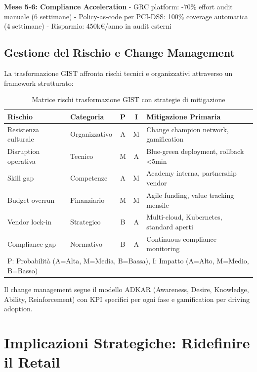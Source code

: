\textbf{Mese 5-6: Compliance Acceleration}
- GRC platform: -70\% effort audit manuale (6 settimane)
- Policy-as-code per PCI-DSS: 100\% coverage automatica (4 settimane)
- Risparmio: 450k€/anno in audit esterni

\subsection{\texorpdfstring{Gestione del Rischio e Change Management}{5.4.3 - Risk e Change}}
\label{subsec:5.4.3}

La trasformazione GIST affronta rischi tecnici e organizzativi attraverso un framework strutturato:

\begin{table}[htbp]
\centering
\caption{Matrice rischi trasformazione GIST con strategie di mitigazione}
\label{tab:risk_mitigation}
\begin{tabular}{@{}llccl@{}}
\toprule
\textbf{Rischio} & \textbf{Categoria} & \textbf{P} & \textbf{I} & \textbf{Mitigazione Primaria} \\
\midrule
Resistenza culturale & Organizzativo & A & M & Change champion network, gamification \\
Disruption operativa & Tecnico & M & A & Blue-green deployment, rollback <5min \\
Skill gap & Competenze & A & M & Academy interna, partnership vendor \\
Budget overrun & Finanziario & M & M & Agile funding, value tracking mensile \\
Vendor lock-in & Strategico & B & A & Multi-cloud, Kubernetes, standard aperti \\
Compliance gap & Normativo & B & A & Continuous compliance monitoring \\
\bottomrule
\multicolumn{5}{l}{\footnotesize P: Probabilità (A=Alta, M=Media, B=Bassa), I: Impatto (A=Alto, M=Medio, B=Basso)}
\end{tabular}
\end{table}

Il change management segue il modello ADKAR (Awareness, Desire, Knowledge, Ability, Reinforcement) con KPI specifici per ogni fase e gamification per driving adoption.

\section{\texorpdfstring{Implicazioni Strategiche: Ridefinire il Retail}{5.5 - Implicazioni Strategiche}}
\label{sec:5.5}

